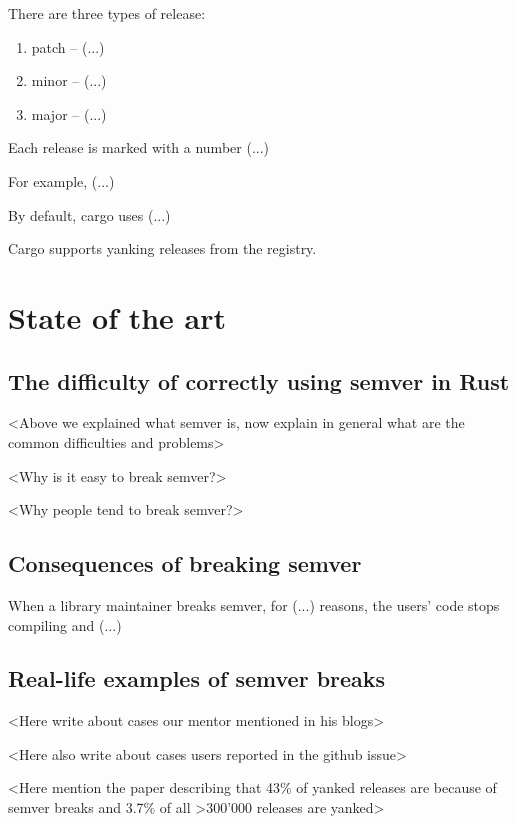 \documentclass[licencjacka,en]{pracamgr}
\begin{document}
There are three types of release:
\begin{enumerate}
	\item patch -- (...)
	\item minor -- (...)
	\item major -- (...)
\end{enumerate}

Each release is marked with a number (...)

For example, (...)

By default, cargo uses (...)

Cargo supports yanking releases from the registry.




\chapter{State of the art}\label{r:stateoftheart}

\section{The difficulty of correctly using semver in Rust}\label{r:semverisdifficult}

<Above we explained what semver is, now explain in general what are the common difficulties and problems>

<Why is it easy to break semver?>

<Why people tend to break semver?>

\section{Consequences of breaking semver}

When a library maintainer breaks semver, for (...) reasons, the users' code stops compiling and (...)


\section{Real-life examples of semver breaks}

<Here write about cases our mentor mentioned in his blogs>

<Here also write about cases users reported in the github issue>

<Here mention the paper describing that 43\% of yanked releases
are because of semver breaks and 3.7\% of all >300'000 releases are yanked>
\end{document}
